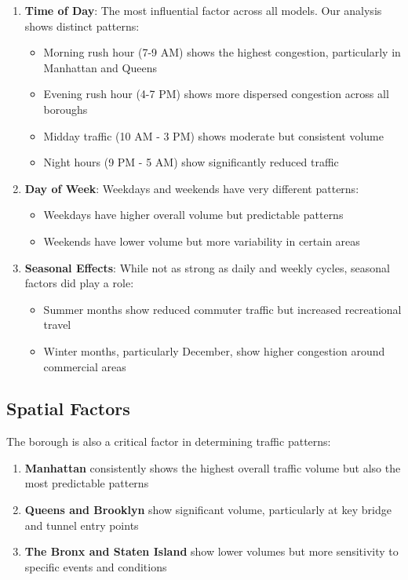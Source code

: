 \documentclass[
  letterpaper,
  DIV=11,
  numbers=noendperiod]{scrreprt}
\providecommand{\tightlist}{%
  \setlength{\itemsep}{0pt}\setlength{\parskip}{0pt}}\usepackage{longtable,booktabs,array}
\begin{document}
\begin{enumerate}
\def\labelenumi{\arabic{enumi}.}
\tightlist
\item
  \textbf{Time of Day}: The most influential factor across all models.
  Our analysis shows distinct patterns:

  \begin{itemize}
  \tightlist
  \item
    Morning rush hour (7-9 AM) shows the highest congestion,
    particularly in Manhattan and Queens
  \item
    Evening rush hour (4-7 PM) shows more dispersed congestion across
    all boroughs
  \item
    Midday traffic (10 AM - 3 PM) shows moderate but consistent volume
  \item
    Night hours (9 PM - 5 AM) show significantly reduced traffic
  \end{itemize}
\item
  \textbf{Day of Week}: Weekdays and weekends have very different
  patterns:

  \begin{itemize}
  \tightlist
  \item
    Weekdays have higher overall volume but predictable patterns
  \item
    Weekends have lower volume but more variability in certain areas
  \end{itemize}
\item
  \textbf{Seasonal Effects}: While not as strong as daily and weekly
  cycles, seasonal factors did play a role:

  \begin{itemize}
  \tightlist
  \item
    Summer months show reduced commuter traffic but increased
    recreational travel
  \item
    Winter months, particularly December, show higher congestion around
    commercial areas
  \end{itemize}
\end{enumerate}

\subsection{Spatial Factors}\label{spatial-factors}

The borough is also a critical factor in determining traffic patterns:

\begin{enumerate}
\def\labelenumi{\arabic{enumi}.}
\tightlist
\item
  \textbf{Manhattan} consistently shows the highest overall traffic
  volume but also the most predictable patterns
\item
  \textbf{Queens and Brooklyn} show significant volume, particularly at
  key bridge and tunnel entry points
\item
  \textbf{The Bronx and Staten Island} show lower volumes but more
  sensitivity to specific events and conditions
\end{enumerate}
\end{document}
